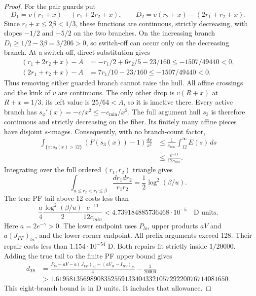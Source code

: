 \begin{proof}
For the pair guards put
\[
 D_1=v(r_1+x)-(r_1+2r_2+x),\qquad
 D_2=v(r_2+x)-(2r_1+r_2+x).
\]
Since $r_i+x\le2\beta<1/3$, these functions are continuous,
strictly decreasing, with slopes $-1/2$ and $-5/2$ on the two branches.
On the increasing branch $D_i\ge1/2-3\beta=3/206>0$,
so switch-off can occur only on the decreasing branch.
At a switch-off, direct substitution gives
\[
\begin{aligned}
 (r_1+2r_2+x)-A&=-r_1/2+6r_2/5-23/160
                  \le-1507/49440<0,\\
 (2r_1+r_2+x)-A&=7r_1/10-23/160
                  \le-1507/49440<0.
\end{aligned}
\]
Thus removing either guarded branch cannot raise the hull.
All affine crossings and the kink of $v$ are continuous.
The only other drop is $v(R+x)$ at $R+x=1/3$;
its left value is $25/64<A$, so it is inactive there.
Every active branch has $s_\phi'(x)=-c/x^2\le-c_{\min}/x^2$.
The full argument hull $s_3$ is therefore continuous and strictly decreasing on the fiber.
Its finitely many affine pieces have disjoint $s$-images.
Consequently, with no branch-count factor,
\[
\begin{aligned}
 \int_{\{x:s_3(x)>12\}}(F(s_3(x))-1)\frac{dx}{x^2}
 &\le\frac1{c_{\min}}\int_{12}^{\infty}E(s)\,ds\\
 &\le\frac{e^{-11}}{12c_{\min}}.
\end{aligned}
\]
Integrating over the full ordered $(r_1,r_2)$ triangle gives
\[
 \int_{u\le r_2<r_1\le\beta}\frac{dr_1dr_2}{r_1r_2}
 =\frac12\log^2(\beta/u).
\]
The true PF tail above 12 costs less than
\[
 \frac a4\frac{\log^2(\beta/u)}2\frac{e^{-11}}{12c_{min}}
 <4.739184885736468\cdot10^{-5}\quad\text{D units}.
\]
Here $a=2e^{-\gamma}>0$.
The lower endpoint uses $P_{lo}$, upper products $aV$ and
$a(J_{PF})_{hi}$, and the lower corner endpoint.
All prefix arguments exceed 128.
Their repair costs less than $1.154\cdot10^{-54}$ D.
Both repairs fit strictly inside $1/20000$.
Adding the true tail to the finite PF upper bound gives
\[
 \begin{aligned}
 d_{T8}&=\frac{P_{lo}-aV-a(J_{PF})_{hi}+(aV_B-I_{BV})_{lo}}4
                 -\frac1{20000}\\
 &>1.61958135698908352559133404332105729220076714081650.
 \end{aligned}
 \tag{3.22}
\]
This eight-branch bound is in D units.
It includes that allowance.


\end{proof}
